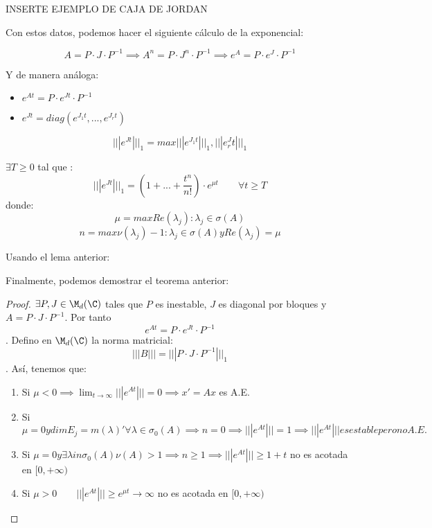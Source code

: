 {INSERTE EJEMPLO DE CAJA DE JORDAN

Con estos datos, podemos hacer el siguiente cálculo de la exponencial:

$$A=P\cdot J \cdot P^{-1} \implies A^n=P \cdot J^n \cdot P^{-1} \implies e^A=P \cdot e^J \cdot P^{-1}$$

Y de manera análoga:
\begin{itemize}
\item $e^{At}=P \cdot e^{Jt} \cdot P^{-1}$
\item $e^{Jt}=diag(e^{J_1t},...,e^{J_rt} )$
\end{itemize}


\begin{lema}
$$|||e^{Jt}|||_1=max{|||e^{J_1t}|||_1,|||e^J_rt|||_1}$$
\end{lema}

\begin{lema}
$\exists T \geq 0 $ tal que :
$$|||e^{Jt}|||_1=(1+...+\frac{t^n}{n!})\cdot e^{\mu t} \qquad \forall t \geq T$$
donde:
$$\mu=max{Re(\lambda_j):\lambda_j\in \sigma(A)}$$
$$n=max{\nu(\lambda_j)-1 : \lambda_j\in \sigma(A) y Re(\lambda_j)=\mu}$$
\end{lema}

Usando el lema anterior:

Finalmente, podemos demostrar el teorema anterior:

\begin{proof}
$\exists P, J \in \M_d(\C)$ tales que $P$ es inestable, $J$ es diagonal por bloques y $A=P\cdot J \cdot P^{-1}$. Por tanto $$e^{At}=P\cdot e^{Jt} \cdot P^{-1}$$.
Defino en $\M_d(\C)$ la norma matricial:
$$|||B|||=|||P\cdot J \cdot P^{-1}|||_1$$.
Así, tenemos que:
\begin{enumerate}
\item Si $\mu < 0 \implies \lim_{t\to\infty}|||e^{At}|||=0\implies x'=Ax$ es A.E.
\item Si $\mu = 0 y dimE_j=m(\lambda)' \forall \lambda \in \sigma_0(A)\implies n=0 \implies |||e^{At}|||=1\implies|||e^{At}||| es estable pero no A.E.$
\item Si $\mu = 0 y \exists \lambda in \sigma_0(A) \nu(A)>1 \implies n\geq 1\implies |||e^{At}|||\geq 1+t$ no es acotada en $[0,+\infty)$
\item Si $\mu > 0 \qquad |||e^{At}|||\geq e^{\mu t}\to \infty$ no es acotada en $[0,+\infty)$
\end{enumerate}
\end{proof}


}
